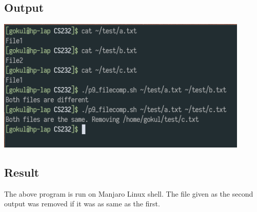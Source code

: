 \documentclass{article}
\begin{document}
\subsection{Output}
\includegraphics[width=0.9\textwidth]{img/p13.png}\newline

\subsection{Result}
The above program is run on Manjaro Linux shell. The file given as the second
output was removed if it was as same as the first.
\end{document}
